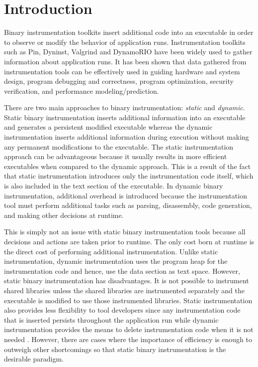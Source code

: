 \section{Introduction}
\label{sec:Introduction}

Binary instrumentation toolkits insert additional code into an
executable in order to observe or modify the behavior of application runs.
Instrumentation toolkits such as Pin\cite{luk2005pin},
Dyninst\cite{buck2000api}, Valgrind\cite{nethercote2007valgrind} and
DynamoRIO\cite{bruening2004efficient} have been widely used to gather
information about application runs. It has been shown that data gathered from
instrumentation tools can be effectively used in guiding hardware and system
design\cite{uhlig1997trace}, program debugging and
correctness\cite{nethercote2007shadow}, program
optimization\cite{romer1997instrumentation}, security
verification\cite{miller-playing}, and performance
modeling/prediction\cite{snavely2001modeling}.

There are two main approaches to binary instrumentation: \textit{static} and
\textit{dynamic}. Static binary instrumentation inserts
additional information into an executable and generates a persistent modified
executable whereas the dynamic instrumentation inserts additional information
during execution without making any permanent modifications to the executable.
The static instrumentation approach can be advantageous because it usually
results in more efficient executables when compared to the dynamic approach.
This is a result of the fact that static instrumentation introduces only the
instrumentation code itself, which is also included in the text section of the
executable. In dynamic binary instrumentation, additional overhead is introduced
because the instrumentation tool must perform additional tasks such as parsing,
disassembly, code generation, and making other decisions at runtime.

This is simply not an issue with static binary instrumentation tools because all
decisions and actions are taken prior to runtime. The only cost born at runtime
is the direct cost of performing additional instrumentation. Unlike static
instrumentation, dynamic instrumentation uses the program heap for the
instrumentation code and hence, use the data section as text space. However,
static binary instrumentation has disadvantages. It is not possible to
instrument shared libraries unless the shared libraries are instrumented
separately and the executable is modified to use those instrumented libraries.
Static instrumentation also provides less flexibility to tool developers since
any instrumentation code that is inserted persists throughout the application
run while dynamic instrumentation provides the means to delete instrumentation
code when it is not needed \cite{tikir2002efficient}. However, there are cases
where the importance of efficiency is enough to outweigh other shortcomings
\cite{carrington2006performance} so that static binary instrumentation is the
desirable paradigm.   

